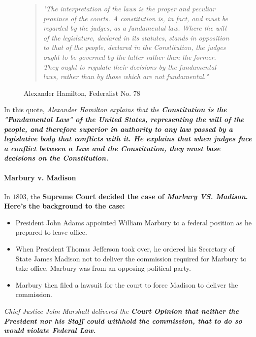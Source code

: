 \newpage

\begin{figure}[h]
    \begin{quote}
        \it{"The interpretation of the laws is the proper and peculiar province of the courts. A constitution is, in fact,
            and must be regarded by the judges, as a fundamental law. Where the will of the legislature, declared in its statutes,
            stands in opposition to that of the people, declared in the Constitution, the judges ought to be governed by the latter
            rather than the former. They ought to regulate their decisions by the fundamental laws, rather than by those which
            are not fundamental."}
    \end{quote}
    \caption{Alexander Hamilton, Federalist No. 78}
\end{figure}

In this quote, \it{Alexander Hamilton} explains that the \bf{Constitution} is the \it{"Fundamental Law"} of the \bf{United States},
representing the will of the people, and therefore superior in authority to any law passed by a legislative body that conflicts
with it. He explains that when judges face a conflict between a \bf{Law} and the \bf{Constitution}, they must base decisions on the Constitution.

\paragraph{Marbury v. Madison} In $1803$, the \bf{Supreme Court} decided the case of \bf{\it{Marbury VS. Madison}}. Here's the background to the case:

\begin{itemize}
    \item President John Adams appointed William Marbury to a federal position as he prepared to leave office.
    \item When President Thomas Jefferson took over, he ordered his Secretary of State James Madison not to deliver the
          commission required for Marbury to take office. Marbury was from an opposing political party.
    \item Marbury then filed a lawsuit for the court to force Madison to deliver the commission.
\end{itemize}

\it{Chief Justice John Marshall} delivered the \bf{Court Opinion} that neither the \bf{President} nor his \bf{Staff} could withhold
the commission, that to do so would violate \bf{Federal Law}.

